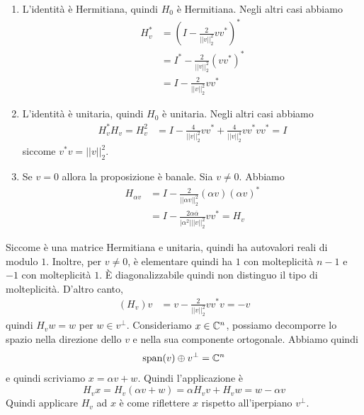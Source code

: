 \documentclass[a4paper]{article}
\begin{document}
\begin{snippetproof}{}
    \begin{enumerate}
        \item L'identità è Hermitiana, quindi \(H_0\) è Hermitiana.
            Negli altri casi abbiamo
            \begin{align*}
                H_v^* &= \left(
                    I - \frac{2}{||v||_2^2} vv^*
                \right)^* \\
                &= I^* - \frac{2}{||v||_2^2} (vv^*)^* \\
                &= I - \frac{2}{||v||_2^2} vv^*
            \end{align*}
        \item L'identità è unitaria, quindi \(H_0\) è unitaria.
            Negli altri casi abbiamo
            \begin{align*}
                H_v^*H_v = H_v^2 &= I - \frac{4}{||v||_2^2}vv^*
                + \frac{4}{||v||_2^4} vv^*vv^* = I
            \end{align*}
            siccome \(v^*v = ||v||_2^2\).
        \item Se \(v=0\) allora la proposizione è banale.
            Sia \(v \neq 0\). Abbiamo
            \begin{align*}
                H_{\alpha v} &= I - \frac{2}{||\alpha v||_2^2} (\alpha v){(\alpha v)}^* \\
                &= I - \frac{2\alpha \overline \alpha}{
                    |\alpha^2| ||v||_2^2
                } vv^* = H_v
            \end{align*}
    \end{enumerate}
\end{snippetproof}

Siccome è una matrice Hermitiana e unitaria, quindi ha autovalori reali
di modulo \(1\).
Inoltre, per \(v\neq 0\), è elementare quindi ha \(1\) con molteplicità \(n-1\)
e \(-1\) con molteplicità \(1\).
È diagonalizzabile quindi non distinguo il tipo di molteplicità.
D'altro canto,
\begin{align*}
    (H_v) v &= v - \frac{2}{||v||_2^2} vv^*v = -v
\end{align*}
quindi \(H_v w = w\) per \(w \in v^\perp\).
Consideriamo \(x \in \mathbb{C}^n\), possiamo decomporre lo spazio nella direzione dello
\(v\) e nella sua componente ortogonale.
Abbiamo quindi
\[
    \operatorname{span}(v) \oplus v^\perp = \mathbb{C}^n
\]
e quindi scriviamo \(x = \alpha v + w\).
Quindi l'applicazione è
\[
    H_v x = H_v(\alpha v + w) = \alpha H_v v + H_v w =
    w - \alpha v
\]
Quindi applicare \(H_v\) ad \(x\) è come riflettere \(x\)
rispetto all'iperpiano \(v^\perp\).
\end{document}
